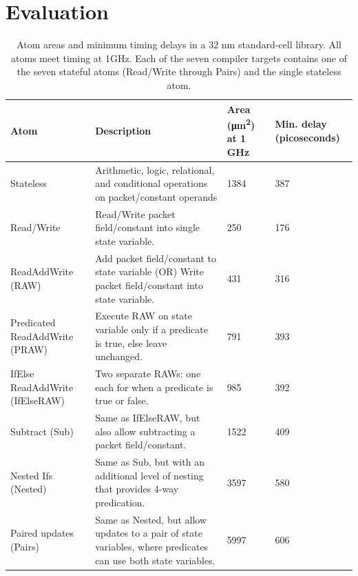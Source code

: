 \section{Evaluation}
\label{s:eval}

\begin{table}[!t]
  \begin{scriptsize}
  \begin{tabular}{|p{}|p{}|p{}|p{}|}
    \hline
    Atom & Description & Area (\si{\micro\metre\squared}) at 1 GHz & Min. delay (picoseconds) \\
    \hline
    Stateless & Arithmetic, logic, relational, and conditional operations on packet/constant operands & 1384 & 387 \\
    \hline
    Read/Write & Read/Write packet field/constant into single state variable. & 250 & 176 \\
    \hline
    ReadAddWrite (RAW) & Add packet field/constant to state variable (OR) Write packet field/constant into state variable. & 431 & 316 \\
    \hline
    Predicated ReadAddWrite (PRAW) & Execute RAW on state variable only if a predicate is true, else leave unchanged. & 791 & 393 \\
    \hline
    IfElse ReadAddWrite (IfElseRAW) & Two separate RAWs: one each for when a predicate is true or false. & 985 & 392 \\
    \hline
    Subtract (Sub) & Same as IfElseRAW, but also allow subtracting a packet field/constant. & 1522 & 409 \\
    \hline
    Nested Ifs (Nested) & Same as Sub, but with an additional level of nesting that provides 4-way predication. & 3597 & 580 \\
    \hline
    Paired updates (Pairs) & Same as Nested, but allow updates to a pair of state variables, where predicates can use both state variables. & 5997 & 606 \\
    \hline
  \end{tabular}
  \end{scriptsize}
  \caption{Atom areas and minimum timing delays in a 32 nm standard-cell
  library.  All atoms meet timing at 1GHz. Each of the seven compiler targets
  contains one of the seven stateful atoms (Read/Write through Pairs) and the
  single stateless atom.}
  \label{tab:templates}
\end{table}

